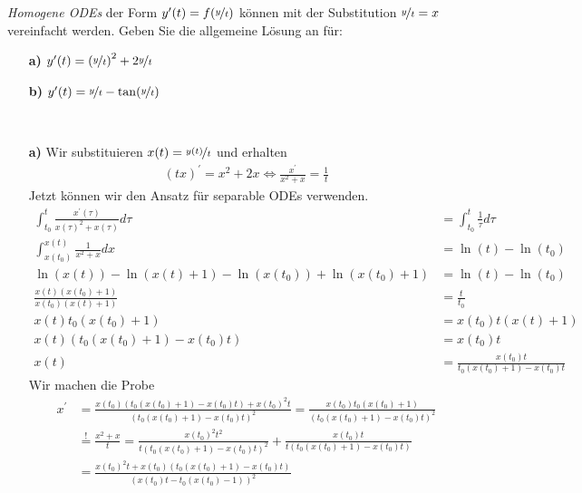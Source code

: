 \begin{exercise}
\textit{Homogene ODEs} der Form $y^{\prime}(t) = f(\nicefrac{y}{t})$
können mit der Substitution $\nicefrac{y}{t} = x$ vereinfacht werden.
Geben Sie die allgemeine Lösung an für:
\begin{itemize}
  \item [\textbf{a)}] $y^{\prime}(t) = \left(\nicefrac{y}{t}\right)^2
  + 2\nicefrac{y}{t}$
  \item [\textbf{b)}] $y^{\prime}(t) = \nicefrac{y}{t} - \tan(\nicefrac{y}{t})$
\end{itemize}
\end{exercise}
\begin{solution}
\leavevmode \\
\begin{itemize}
  \item [\textbf{a)}] Wir substituieren $x(t) = \nicefrac{y(t)}{t}$ und erhalten
  \begin{align*}
    (tx)^{\prime} = x^2 + 2x \iff \frac{x^{\prime}}{x^2 + x} = \frac{1}{t}
  \end{align*}
  Jetzt können wir den Ansatz für separable ODEs verwenden.
  \begin{align*}
    \int_{t_0}^t \frac{x^{\prime}(\tau)}{x(\tau)^2 + x(\tau)}d\tau &= \int_{t_0}^t \frac{1}{\tau}d\tau \\
    \int_{x(t_0)}^{x(t)} \frac{1}{x^2 + x}dx &= \ln(t) - \ln(t_0)\\
    \ln(x(t)) - \ln(x(t) + 1) - \ln(x(t_0)) + \ln(x(t_0) + 1) &= \ln(t) - \ln(t_0)\\
    \frac{x(t)(x(t_0) + 1)}{x(t_0)(x(t) + 1)} &= \frac{t}{t_0} \\
    x(t)t_0(x(t_0) + 1) &= x(t_0)t(x(t) + 1) \\
    x(t)(t_0(x(t_0) + 1) - x(t_0)t) &= x(t_0)t \\
    x(t) &= \frac{x(t_0)t}{t_0(x(t_0) + 1) - x(t_0)t}
  \end{align*}
  Wir machen die Probe
  \begin{align*}
    x^{\prime} &= \frac{x(t_0)(t_0(x(t_0) + 1) - x(t_0)t) + x(t_0)^2t}{(t_0(x(t_0) + 1) - x(t_0)t)^2}
    = \frac{x(t_0)t_0(x(t_0) + 1)}{(t_0(x(t_0) + 1) - x(t_0)t)^2}\\
    &\stackrel{!}{=} \frac{x^2 + x}{t}
    = \frac{x(t_0)^2t^2}{t(t_0(x(t_0) + 1) - x(t_0)t)^2} + \frac{x(t_0)t}{t(t_0(x(t_0) + 1) - x(t_0)t)} \\
    &= \frac{x(t_0)^2t + x(t_0)(t_0(x(t_0) + 1) - x(t_0)t)}{(x(t_0)t - t_0(x(t_0) - 1))^2}\\

\end{align*}
\end{itemize}
\end{solution}
